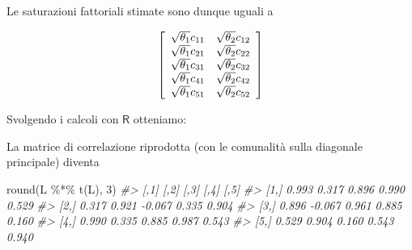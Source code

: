 \documentclass[
  11pt,
]{krantz}
\makeatletter
\newenvironment{Shaded}{\begin{snugshade}}{\end{snugshade}}
\newcommand{\CommentTok}[1]{\textcolor[rgb]{0.37,0.37,0.37}{\textit{#1}}}
\newcommand{\DecValTok}[1]{\textcolor[rgb]{0.06,0.06,0.06}{#1}}
\newcommand{\FunctionTok}[1]{\textcolor[rgb]{0,0,0}{#1}}
\newcommand{\NormalTok}[1]{#1}
\newcommand{\OtherTok}[1]{\textcolor[rgb]{0.37,0.37,0.37}{#1}}
\newcommand{\SpecialCharTok}[1]{\textcolor[rgb]{0,0,0}{#1}}
\newenvironment{kframe}{%
\medskip{}
\setlength{\fboxsep}{.8em}
 \def\at@end@of@kframe{}%
 \ifinner\ifhmode%
  \def\at@end@of@kframe{\end{minipage}}%
  \begin{minipage}{\columnwidth}%
 \fi\fi%
 \def\FrameCommand##1{\hskip\@totalleftmargin \hskip-\fboxsep
 \colorbox{shadecolor}{##1}\hskip-\fboxsep
     \hskip-\linewidth \hskip-\@totalleftmargin \hskip\columnwidth}%
 \MakeFramed {\advance\hsize-\width
   \@totalleftmargin\z@ \linewidth\hsize
   \@setminipage}}%
 {\par\unskip\endMakeFramed%
 \at@end@of@kframe}
\renewenvironment{Shaded}{\begin{kframe}}{\end{kframe}}
\theoremstyle{definition}
\theoremstyle{definition}
\theoremstyle{definition}
\theoremstyle{definition}
\theoremstyle{remark}
\makeatother
\begin{document}
Le saturazioni fattoriali stimate sono dunque uguali a

\[
\left[
  \begin{array}{ c c }
 \sqrt{\theta_1}c_{11} & \sqrt{\theta_2}c_{12} \\
 \sqrt{\theta_1}c_{21} & \sqrt{\theta_2}c_{22} \\
 \sqrt{\theta_1}c_{31} & \sqrt{\theta_2}c_{32} \\
 \sqrt{\theta_1}c_{41} & \sqrt{\theta_2}c_{42} \\
 \sqrt{\theta_1}c_{51} & \sqrt{\theta_2}c_{52} 
  \end{array} 
\right]
\]

Svolgendo i calcoli con \(\textsf{R}\) otteniamo:

\begin{Shaded}
\end{Shaded}

La matrice di correlazione riprodotta (con le comunalità sulla diagonale principale) diventa

\begin{Shaded}
\begin{Highlighting}[]
\FunctionTok{round}\NormalTok{(L }\SpecialCharTok{\%*\%} \FunctionTok{t}\NormalTok{(L), }\DecValTok{3}\NormalTok{)}
\CommentTok{\#\textgreater{}       [,1]   [,2]   [,3]  [,4]  [,5]}
\CommentTok{\#\textgreater{} [1,] 0.993  0.317  0.896 0.990 0.529}
\CommentTok{\#\textgreater{} [2,] 0.317  0.921 {-}0.067 0.335 0.904}
\CommentTok{\#\textgreater{} [3,] 0.896 {-}0.067  0.961 0.885 0.160}
\CommentTok{\#\textgreater{} [4,] 0.990  0.335  0.885 0.987 0.543}
\CommentTok{\#\textgreater{} [5,] 0.529  0.904  0.160 0.543 0.940}
\end{Highlighting}
\end{Shaded}
\end{document}
